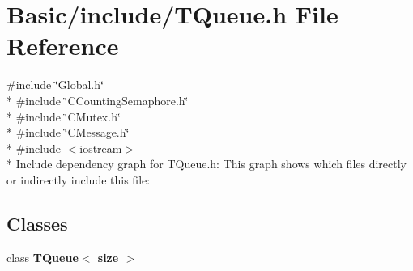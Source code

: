 \section{Basic/include/\-T\-Queue.h File Reference}
\label{TQueue_8h}
{\ttfamily \#include \char`\"{}Global.\-h\char`\"{}}\\*
{\ttfamily \#include \char`\"{}C\-Counting\-Semaphore.\-h\char`\"{}}\\*
{\ttfamily \#include \char`\"{}C\-Mutex.\-h\char`\"{}}\\*
{\ttfamily \#include \char`\"{}C\-Message.\-h\char`\"{}}\\*
{\ttfamily \#include $<$iostream$>$}\\*
Include dependency graph for T\-Queue.\-h\-:
This graph shows which files directly or indirectly include this file\-:
\subsection*{Classes}
\begin{DoxyCompactItemize}
\item 
class {\bf T\-Queue$<$ size $>$}
\end{DoxyCompactItemize}
